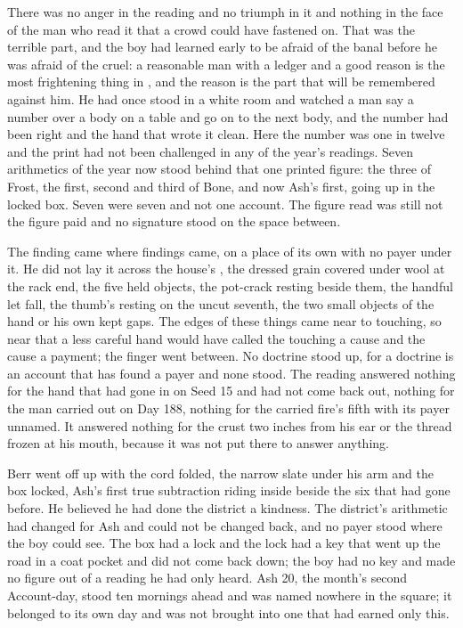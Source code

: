 There was no anger in the reading and no triumph in it and nothing in the face of the man who read it that a crowd could have fastened on. That was the terrible part, and the boy had learned early to be afraid of the banal before he was afraid of the cruel: a reasonable man with a ledger and a good reason is the most frightening thing in , and the reason is the part that will be remembered against him. He had once stood in a white room and watched a man say a number over a body on a table and go on to the next body, and the number had been right and the hand that wrote it clean. Here the number was one in twelve and the print had not been challenged in any of the year's readings. Seven arithmetics of the year now stood behind that one printed figure: the three of Frost, the first, second and third of Bone, and now Ash's first, going up in the locked box. Seven were seven and not one account. The figure read was still not the figure paid and no signature stood on the space between.

The finding came where findings came, on a place of its own with no payer under it. He did not lay it across the house's , the dressed grain covered under wool at the rack end, the five held objects, the pot-crack resting beside them, the handful let fall, the thumb's resting on the uncut seventh, the two small objects of the hand or his own kept gaps. The edges of these things came near to touching, so near that a less careful hand would have called the touching a cause and the cause a payment; the finger went between. No doctrine stood up, for a doctrine is an account that has found a payer and none stood. The reading answered nothing for the hand that had gone in on Seed 15 and had not come back out, nothing for the man carried out on Day 188, nothing for the carried fire's fifth with its payer unnamed. It answered nothing for the crust two inches from his ear or the thread frozen at his mouth, because it was not put there to answer anything.

Berr went off up  with the cord folded, the narrow slate under his arm and the box locked, Ash's first true subtraction riding inside beside the six that had gone before. He believed he had done the district a kindness. The district's arithmetic had changed for Ash and could not be changed back, and no payer stood where the boy could see. The box had a lock and the lock had a key that went up the road in a coat pocket and did not come back down; the boy had no key and made no figure out of a reading he had only heard. Ash 20, the month's second Account-day, stood ten mornings ahead and was named nowhere in the square; it belonged to its own day and was not brought into one that had earned only this.

